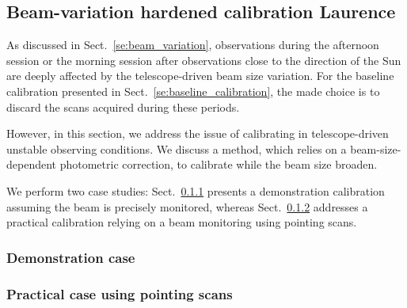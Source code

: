 \subsection{Beam-variation hardened calibration {\color{blue} Laurence} }

As discussed in Sect.~\ref{se:beam_variation}, observations during the
afternoon session or the morning session after observations close to the
direction of the Sun are deeply affected by the telescope-driven beam
size variation. For the baseline calibration presented in
Sect.~\ref{se:baseline_calibration}, the made choice is to discard the
scans acquired during these periods.

However, in this section, we address the issue of calibrating in
telescope-driven unstable observing conditions. We discuss a method,
which relies on a beam-size-dependent photometric correction, to
calibrate while the beam size broaden.

We perform two case studies: Sect.~\ref{se:cal_democase} presents a demonstration
calibration assuming the beam is precisely monitored, whereas
Sect.~\ref{se:cal_pointings} addresses a practical calibration relying
on a beam monitoring using pointing scans. 


\subsubsection{Demonstration case}
\label{se:cal_democase}


\subsubsection{Practical case using pointing scans}
\label{se:cal_pointings}

